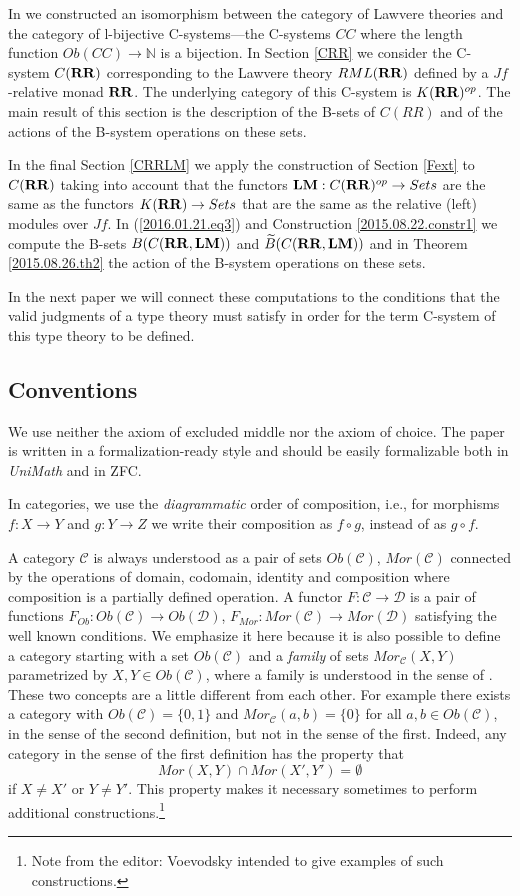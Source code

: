 \documentclass[12pt]{amsart}
\numberwithin{proposition}{subsection}
\newcommand{\sr}{\rightarrow}
\newcommand{\nn}{{\mathbb N}}
\newcommand{\nat}{\nn}
\newcommand{\wt}{\widetilde}
\newcommand{\RR}{{\bf RR}}
\newcommand{\LM}{{\bf LM}}
\newcommand{\C}{{\mathcal C}}
\newcommand{\D}{{\mathcal D}}
\newcommand{\editorfootnote}[1]{\footnote{Note from the editor: #1}}
\begin{document}
In \cite{LandC} we constructed an isomorphism between the category of Lawvere
theories and the category of l-bijective C-systems---the C-systems $CC$ where
the length function $Ob(CC)\sr \nat$ is a bijection. In Section \ref{CRR} we
consider the C-system $C(\RR)$ corresponding to the Lawvere theory $RML(\RR)$
defined by a $Jf$-relative monad $\RR$. The underlying category of this
C-system is $K(\RR)^{op}$. The main result of this section is the description
of the B-sets of $C(RR)$ and of the actions of the B-system operations on these
sets.

In the final Section \ref{CRRLM} we apply the construction of Section
\ref{Fext} to $C(\RR)$ taking into account that the functors
$\LM:C(\RR)^{op}\sr Sets$ are the same as the functors $K(\RR)\sr Sets$ that
are the same as the relative (left) modules over $Jf$. In
(\ref{2016.01.21.eq3}) and Construction \ref{2015.08.22.constr1} we compute the
B-sets $B(C(\RR,\LM))$ and $\wt{B}(C(\RR,\LM))$ and in Theorem
\ref{2015.08.26.th2} the action of the B-system operations on these sets.

In the next paper we will connect these computations to the conditions that the
valid judgments of a type theory must satisfy in order for the term C-system
of this type theory to be defined.

\subsection{Conventions}

We use neither the axiom of excluded middle nor the axiom of choice. The paper
is written in a formalization-ready style and should be easily formalizable
both in {\em UniMath} and in ZFC.

In categories, we use the {\em diagrammatic} order of composition, i.e., for morphisms $f:X\sr Y$
and $g:Y\sr Z$ we write their composition as $f\circ g$, instead of as $g \circ f$.

A category $\C$ is always understood as a pair of sets $Ob(\C)$, $Mor(\C)$
connected by the operations of domain, codomain, identity and composition where
composition is a partially defined operation. A functor $F:\C\sr \D$ is a pair
of functions $F_{Ob}:Ob(\C)\sr Ob(\D)$, $F_{Mor}:Mor(\C)\sr Mor(\D)$ satisfying
the well known conditions. We emphasize it here because it is also possible to
define a category starting with a set $Ob(\C)$ and a {\em family} of sets
$Mor_{\C}(X,Y)$ parametrized by $X,Y\in Ob(\C)$, where a {family} is understood
in the sense of \cite[Remark 3.9]{fromunivwithPiI}. These two concepts are a
little different from each other. For example there exists a category with
$Ob(\C)=\{0,1\}$ and $Mor_{\C}(a,b)=\{0\}$ for all $a,b\in Ob(\C)$, in the
sense of the second definition, but not in the sense of the first. Indeed, any
category in the sense of the first definition has the property that
%
$$Mor(X,Y)\cap Mor(X',Y')=\emptyset$$
%
if $X\ne X'$ or $Y\ne Y'$. This property makes it necessary sometimes to
perform additional constructions.\editorfootnote{Voevodsky
  intended to give examples of such constructions.}
\end{document}
